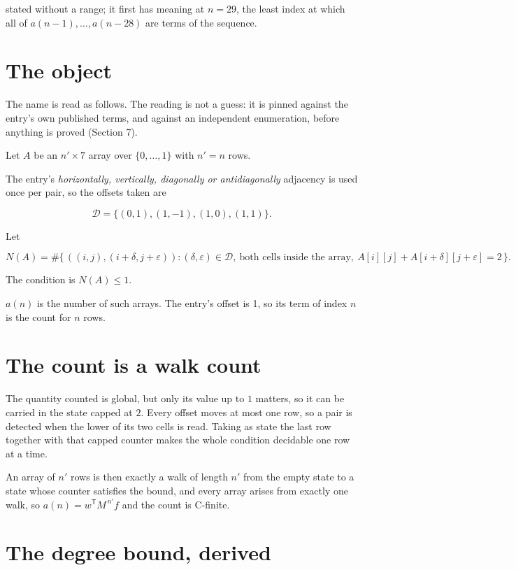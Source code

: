 \documentclass[11pt]{article}
\theoremstyle{definition}
\begin{document}
stated without a range; it first has meaning at $n = 29$, the least index at which all of $a(n-1),\dots,a(n-28)$ are terms of the sequence.

\section{The object}

The name is read as follows. The reading is not a guess: it is pinned against the entry's own published terms, and against an independent enumeration, before anything is proved (Section 7).

Let $A$ be an $n' \times 7$ array over $\{0,\dots,1\}$ with $n' = n$ rows.

The entry's {\itshape horizontally, vertically, diagonally or antidiagonally} adjacency is used once per pair, so the offsets taken are

\[\mathcal{D} = \{(0,1), (1,-1), (1,0), (1,1)\}.\]

Let

\[N(A) = \#\bigl\{\,((i,j),(i{+}\delta,j{+}\varepsilon)) : (\delta,\varepsilon) \in \mathcal{D},\ \text{both cells inside the array},\ A[i][j] + A[i{+}\delta][j{+}\varepsilon] = 2\,\bigr\}.\]

The condition is $N(A) \le 1$.

$a(n)$ is the number of such arrays. The entry's offset is 1, so its term of index $n$ is the count for $n$ rows.

\section{The count is a walk count}

The quantity counted is global, but only its value up to $1$ matters, so it can be carried in the state capped at $2$. Every offset moves at most one row, so a pair is detected when the lower of its two cells is read. Taking as state the last row together with that capped counter makes the whole condition decidable one row at a time.

An array of $n'$ rows is then exactly a walk of length $n'$ from the empty state to a state whose counter satisfies the bound, and every array arises from exactly one walk, so $a(n) = w^{\mathsf T}M^{\,n'}f$ and the count is C-finite.

\section{The degree bound, derived}
\end{document}
